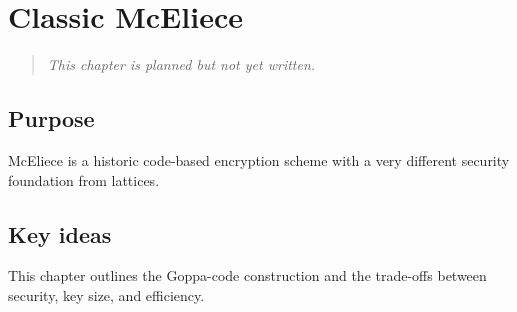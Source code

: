 \chapter{Classic McEliece}

\begin{quote}
\textit{This chapter is planned but not yet written.}
\end{quote}

\section{Purpose}
McEliece is a historic code-based encryption scheme with a very different security foundation from lattices.
\section{Key ideas}
This chapter outlines the Goppa-code construction and the trade-offs between security, key size, and efficiency.
